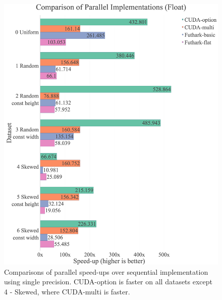 \begin{figure}[H]
	\centering
	\caption{Comparisons of parallel speed-ups over sequential implementation using single precision. CUDA-option is faster on all datasets except 4 - Skewed, where CUDA-multi is faster.}
    \label{fig:results:speedup-float}
    \includegraphics[width=1\textwidth]{img/experiments/all-approaches-float.png}
\end{figure}

